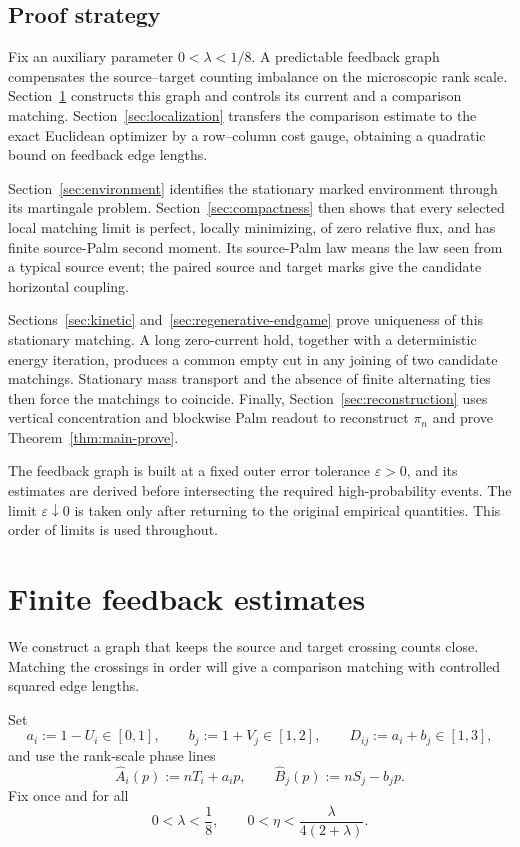 \documentclass[11pt,reqno]{amsart}
\theoremstyle{definition}
\theoremstyle{remark}
\numberwithin{equation}{section}
\begin{document}
\subsection{Proof strategy}

Fix an auxiliary parameter \(0<\lambda<1/8\). A predictable feedback
graph compensates the source--target counting imbalance on the
microscopic rank scale. Section~\ref{sec:feedback} constructs this
graph and controls its current and a comparison matching.
Section~\ref{sec:localization} transfers the comparison estimate to the
exact Euclidean optimizer by a row--column cost gauge, obtaining a
quadratic bound on feedback edge lengths.

Section~\ref{sec:environment} identifies the stationary marked
environment through its martingale problem. Section~\ref{sec:compactness}
then shows that every selected local matching limit is perfect,
locally minimizing, of zero relative flux, and has finite source-Palm
second moment. Its source-Palm law means the law seen from a typical
source event; the paired source and target marks give the candidate
horizontal coupling.

Sections~\ref{sec:kinetic} and~\ref{sec:regenerative-endgame} prove
uniqueness of this stationary matching. A long zero-current hold,
together with a deterministic energy iteration, produces a common
empty cut in any joining of two candidate matchings. Stationary mass
transport and the absence of finite alternating ties then force the
matchings to coincide. Finally, Section~\ref{sec:reconstruction} uses
vertical concentration and blockwise Palm readout to reconstruct
\(\pi_n\) and prove Theorem~\ref{thm:main-prove}.

The feedback graph is built at a fixed outer error tolerance
\(\varepsilon>0\), and its estimates are derived before intersecting
the required high-probability events. The limit
\(\varepsilon\downarrow0\) is taken only after returning to the
original empirical quantities. This order of limits is used throughout.

\section{Finite feedback estimates}
\label{sec:feedback}

We construct a graph that keeps the source and target crossing counts
close.  Matching the crossings in order will give a comparison matching
with controlled squared edge lengths.

Set
\[
a_i:=1-U_i\in[0,1],\qquad b_j:=1+V_j\in[1,2],\qquad
D_{ij}:=a_i+b_j\in[1,3],
\]
and use the rank-scale phase lines
\begin{equation}
\widehat A_i(p):=nT_i+a_ip,\qquad
\widehat B_j(p):=nS_j-b_jp.
\label{eq:1.1}
\end{equation}
Fix once and for all
\begin{equation}
0<\lambda<\frac18,
\qquad
0<\eta<\frac{\lambda}{4(2+\lambda)}.
\label{eq:1.2}
\end{equation}
\end{document}

